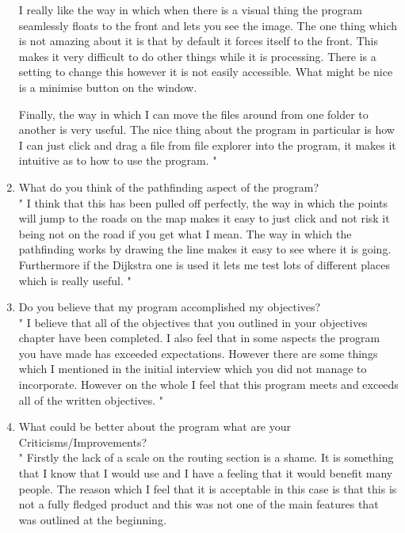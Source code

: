 \begin{FlushLeft}
\begin{enumerate}
        I really like the way in which when there is a visual thing the program seamlessly floats to the front and lets you see the image. The one thing which is not amazing about it is that by default it forces itself to the front. This makes it very difficult to do other things while it is processing. There is a setting to change this however it is not easily accessible. What might be nice is a minimise button on the window. \\ \bk

        Finally, the way in which I can move the files around from one folder to another is very useful. The nice thing about the program in particular is how I can just click and drag a file from file explorer into the program, it makes it intuitive as to how to use the program.
        "

        \item What do you think of the pathfinding aspect of the program? \\\bk
        "
        I think that this has been pulled off perfectly, the way in which the points will jump to the roads on the map makes it easy to just click and not risk it being not on the road if you get what I mean. The way in which the pathfinding works by drawing the line makes it easy to see where it is going. \\

        Furthermore if the Dijkstra one is used it lets me test lots of different places which is really useful.
        " 
    
        \item Do you believe that my program accomplished my objectives? \\\bk
        "
        I believe that all of the objectives that you outlined in your objectives chapter have been completed. I also feel that in some aspects the program you have made has exceeded expectations. However there are some things which I mentioned in the initial interview which you did not manage to incorporate. However on the whole I feel that this program meets and exceeds all of the written objectives.
        " 

        \item What could be better about the program what are your Criticisms/Improvements? \\\bk
        "
        Firstly the lack of a scale on the routing section is a shame. It is something that I know that I would use and I have a feeling that it would benefit many people. The reason which I feel that it is acceptable in this case is that this is not a fully fledged product and this was not one of the main features that was outlined at the beginning. \\ \bk


\end{enumerate}
\end{FlushLeft}
